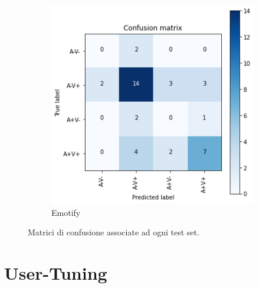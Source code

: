 \documentclass[11pt]{report}
\begin{document}
\begin{figure}[h]
\begin{subfigure}[t]{.5\textwidth}
    \includegraphics[scale = 0.6]{img/es3-Emotify.png}
    \caption{Emotify}
    \label{fig:es3C}
	\end{subfigure}
	\quad
\caption{Matrici di confusione associate ad ogni test set.}
\label{fig:es3}
\end{figure}

\newpage
\chapter{User-Tuning}
\end{document}
